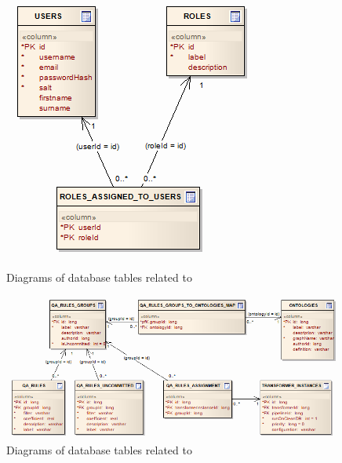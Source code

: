 \begin{figure}[htbp]
    \centering
    \includegraphics[scale=0.6]{images/db-fe.png}
    \caption{Diagrams of database tables related to \FE}
	\label{fig:dbFrontend}
\end{figure}

\begin{figure}[htbp]
    \centering
    \includegraphics[scale=0.6]{images/db-qa.png}
    \caption{Diagrams of database tables related to \QA}
	\label{fig:dbQA}
\end{figure}

